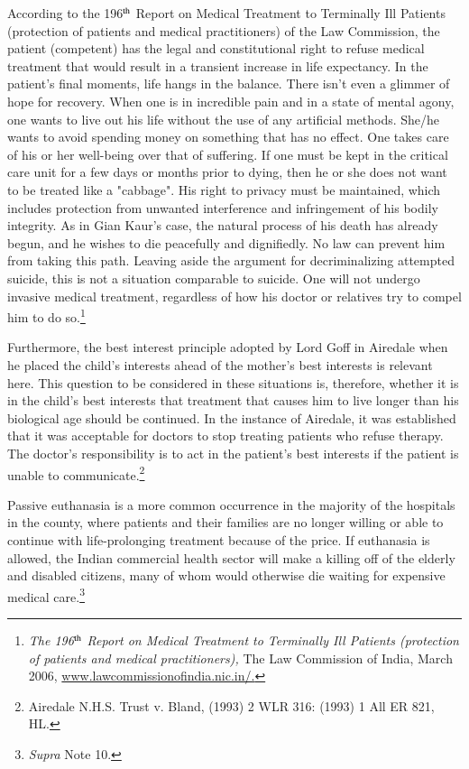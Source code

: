 \begin{multicols}{2}
\noi
According to the 196$^{\rm th}$ Report on Medical Treatment to Terminally Ill Patients (protection of
patients and medical practitioners) of the Law Commission, the patient (competent) has the
legal and constitutional right to refuse medical treatment that would result in a transient
increase in life expectancy. In the patient's final moments, life hangs in the balance. There
isn't even a glimmer of hope for recovery. When one is in incredible pain and in a state of
mental agony, one wants to live out his life without the use of any artificial methods. She/he
wants to avoid spending money on something that has no effect. One takes care of his or her
well-being over that of suffering. If one must be kept in the critical care unit for a few days or
months prior to dying, then he or she does not want to be treated like a "cabbage". His right
to privacy must be maintained, which includes protection from unwanted interference and
infringement of his bodily integrity. As in Gian Kaur's case, the natural process of his death
has already begun, and he wishes to die peacefully and dignifiedly. No law can prevent him
from taking this path. Leaving aside the argument for decriminalizing attempted suicide, this
is not a situation comparable to suicide. One will not undergo invasive medical treatment,
regardless of how his doctor or relatives try to compel him to do so.\footnote{\textit{The 196$^{\rm th}$ Report on Medical Treatment to Terminally Ill Patients (protection of patients and medical
practitioners),} The Law Commission of India, March 2006, \url{www.lawcommissionofindia.nic.in/.}}

\noi
Furthermore, the best interest principle adopted by Lord Goff in Airedale when he placed the
child's interests ahead of the mother's best interests is relevant here. This question to be
considered in these situations is, therefore, whether it is in the child's best interests that 
treatment that causes him to live longer than his biological age should be continued. In the
instance of Airedale, it was established that it was acceptable for doctors to stop treating
patients who refuse therapy. The doctor's responsibility is to act in the patient's best interests
if the patient is unable to communicate.\footnote{Airedale N.H.S. Trust v. Bland, (1993) 2 WLR 316: (1993) 1 All ER 821, HL.}


\noi
Passive euthanasia is a more common occurrence in the majority of the hospitals in the
county, where patients and their families are no longer willing or able to continue with life-prolonging treatment because of the price. If euthanasia is allowed, the Indian commercial health sector will make a killing off of the elderly and disabled citizens, many of whom would otherwise die waiting for expensive medical care.\footnote{\textit{Supra} Note 10.}


\end{multicols}
